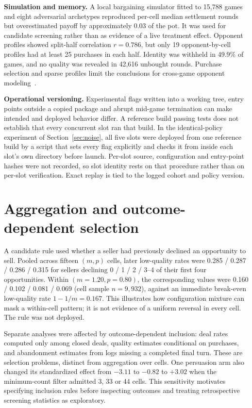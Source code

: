\documentclass{article}
\begin{document}
\textbf{Simulation and memory.} A local bargaining simulator fitted to 15,788
games and eight adversarial archetypes reproduced per-cell median settlement
rounds but overestimated payoff by approximately 0.03 of the pot. It was used
for candidate screening rather than as evidence of a live treatment effect.
Opponent profiles showed split-half correlation $r=0.786$, but only 19
opponent-by-cell profiles had at least 25 purchases in each half. Identity was
withheld in 49.9\% of games, and no quality was revealed in 42,616 unbought
rounds. Purchase selection and sparse profiles limit the conclusions for
cross-game opponent modeling~\cite{baarslag2016survey}.

\textbf{Operational versioning.} Experimental flags written into a working
tree, entry points outside a copied package and abrupt mid-game termination
can make intended and deployed behavior differ. A reference build passing
tests does not establish that every concurrent slot ran that build. In the
identical-policy experiment of Section~\ref{sec:noise}, all five slots were
deployed from one reference build by a script that sets every flag explicitly
and checks it from inside each slot's own directory before launch. Per-slot
source, configuration and entry-point hashes were not recorded, so slot identity
rests on that procedure rather than on per-slot verification. Exact replay is
tied to the logged cohort and policy version.

\section{Aggregation and outcome-dependent selection}
\label{app:simpson}
A candidate rule used whether a seller had previously declined an opportunity
to sell. Pooled across fifteen $(m,p)$ cells, later low-quality rates were
0.285 / 0.287 / 0.286 / 0.315 for sellers declining 0 / 1 / 2 / 3--4 of their
first four opportunities. Within $(m=1.20,p=0.80)$, the corresponding values
were 0.160 / 0.102 / 0.081 / 0.069 (cell sample $n=9,932$), against an immediate
break-even low-quality rate $1-1/m=0.167$. This illustrates how configuration
mixture can mask a within-cell pattern; it is not evidence of a uniform reversal
in every cell. The rule was not deployed.

Separate analyses were affected by outcome-dependent inclusion: deal rates
computed only among closed deals, quality estimates conditional on purchases,
and abandonment estimates from logs missing a completed final turn. These are
selection problems, distinct from aggregation over cells. One persuasion arm
also changed its standardized effect from $-3.11$ to $-0.82$ to $+3.02$ when
the minimum-count filter admitted 3, 33 or 44 cells. This sensitivity motivates
specifying inclusion rules before inspecting outcomes and treating retrospective
screening statistics as exploratory.
\end{document}

